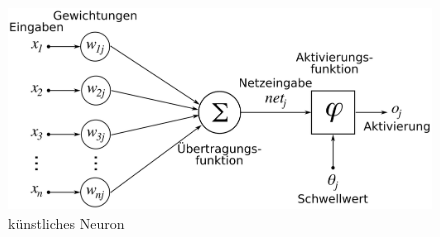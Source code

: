 \documentclass{llncs}
\begin{document}
\begin{figure}[htbp] 
	\centering
	\includegraphics[width=1.0\textwidth]{Neuron.png}
	\caption{künstliches Neuron}
	\label{fig:Bild1}
\end{figure}
\end{document}
